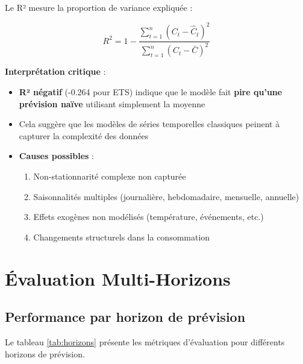 \documentclass[12pt,a4paper]{article}
\begin{document}
Le R² mesure la proportion de variance expliquée :

\begin{equation}
    R^2 = 1 - \frac{\sum_{t=1}^{n}(C_t - \hat{C}_t)^2}{\sum_{t=1}^{n}(C_t - \bar{C})^2}
\end{equation}

\textbf{Interprétation critique} :
\begin{itemize}
    \item \textbf{R² négatif} (-0.264 pour ETS) indique que le modèle fait \textbf{pire qu'une prévision naïve} utilisant simplement la moyenne
    \item Cela suggère que les modèles de séries temporelles classiques peinent à capturer la complexité des données
    \item \textbf{Causes possibles} :
        \begin{enumerate}
            \item Non-stationnarité complexe non capturée
            \item Saisonnalités multiples (journalière, hebdomadaire, mensuelle, annuelle)
            \item Effets exogènes non modélisés (température, événements, etc.)
            \item Changements structurels dans la consommation
        \end{enumerate}
\end{itemize}

\section{Évaluation Multi-Horizons}

\subsection{Performance par horizon de prévision}

Le tableau \ref{tab:horizons} présente les métriques d'évaluation pour différents horizons de prévision.

\begin{table}[h]
\centering
\caption{Performance des prévisions par horizon}
\label{tab:horizons}
\end{table}
\end{document}

